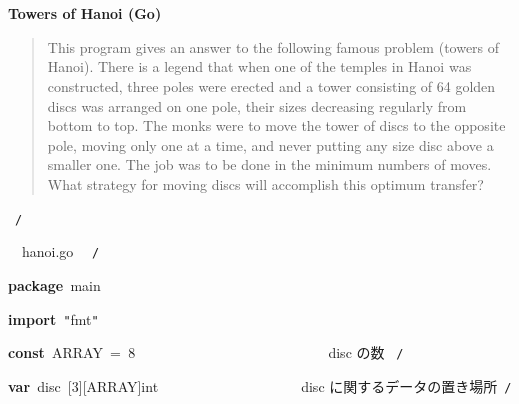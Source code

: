 \documentclass[a4paper,10pt]{article}
\def\mc{\relax}
\begin{document}
\tt\mc 

\noindent
\mbox{}\rm\mc {\tt /}{\tt *}\  \hrulefill *
\tt\mc 

\noindent
\mbox{}\hfill

\noindent
\mbox{}\rm\mc \ %

\centerline{\bf Towers of Hanoi (Go)}

\begin{quote}

This program gives an answer to the following famous problem (towers of
Hanoi).
There is a legend that when one of the temples in Hanoi was constructed,
three poles were erected and a tower consisting of 64 golden discs was
arranged on one pole, their sizes decreasing regularly from bottom to top.
The monks were to move the tower of discs to the opposite pole, moving
only one at a time, and never putting any size disc above a smaller one.
The job was to be done in the minimum numbers of moves. What strategy for
moving discs will accomplish this optimum transfer?
\end{quote}

\tt\mc 

\noindent
\mbox{}\hfill

\noindent
\mbox{}\rm\mc {\tt *} \hrulefill \rm\mc \ {\tt *}{\tt /}
\tt\mc 

\noindent
\mbox{}\hfill

\noindent
\mbox{}\rm\mc {\tt /}{\tt *}\  \hrulefill\ hanoi.go \ \hrulefill \rm\mc \ {\tt *}{\tt /}
\tt\mc 

\noindent
\mbox{}\hfill

\noindent
\mbox{}\textbf{package}{\tt\mc \ }main

\noindent
\mbox{}\hfill

\noindent
\mbox{}\textbf{import}{\tt\mc \ }{\tt "}fmt{\tt "}

\noindent
\mbox{}\hfill

\noindent
\mbox{}\textbf{const}{\tt\mc \ }ARRAY{\tt\mc \ }={\tt\mc \ }8{\tt\mc \ }{\tt\mc \ }{\tt\mc \ }{\tt\mc \ }{\tt\mc \ }{\tt\mc \ }{\tt\mc \ }{\tt\mc \ }{\tt\mc \ }{\tt\mc \ }{\tt\mc \ }{\tt\mc \ }{\tt\mc \ }{\tt\mc \ }{\tt\mc \ }{\tt\mc \ }{\tt\mc \ }{\tt\mc \ }{\tt\mc \ }{\tt\mc \ }{\tt\mc \ }{\tt\mc \ }{\tt\mc \ }{\tt\mc \ }{\tt\mc \ }\rm\mc {\tt /}{\tt *}\  \ disc の数 \hfill \rm\mc \ {\tt *}{\tt /}
\tt\mc 

\noindent
\mbox{}\hfill

\noindent
\mbox{}\textbf{var}{\tt\mc \ }disc{\tt\mc \ }[3][ARRAY]int{\tt\mc \ }{\tt\mc \ }{\tt\mc \ }{\tt\mc \ }{\tt\mc \ }{\tt\mc \ }{\tt\mc \ }{\tt\mc \ }{\tt\mc \ }{\tt\mc \ }{\tt\mc \ }{\tt\mc \ }{\tt\mc \ }{\tt\mc \ }{\tt\mc \ }{\tt\mc \ }{\tt\mc \ }{\tt\mc \ }\rm\mc {\tt /}{\tt *}\  \ disc に関するデータの置き場所\hfill \rm\mc \ {\tt *}{\tt /}
\tt\mc 
\end{document}
